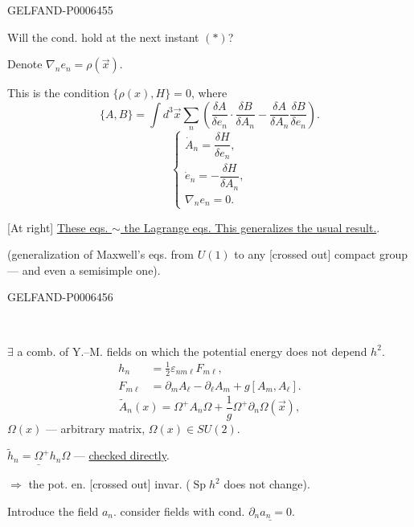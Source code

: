 \begin{GelfandAdjacentEvidence}{GELFAND-P000645}{5}


Will the cond. hold at the next instant \((*)\)?

Denote \(\nabla_n e_n=\rho(\vec x)\).

This is the condition \(\{\rho(x),H\}=0\), where
\[
\{A,B\}=\int d^3\vec x\sum_n
\left(\frac{\delta A}{\delta e_n}\cdot\frac{\delta B}{\delta A_n}
-\frac{\delta A}{\delta A_n}\frac{\delta B}{\delta e_n}\right).
\]
\[
\begin{cases}
\dot A_n=\dfrac{\delta H}{\delta e_n},\\
\dot e_n=-\dfrac{\delta H}{\delta A_n},\\
\nabla_n e_n=0.
\end{cases}
\]

[At right] \underline{These eqs. \(\sim\) the Lagrange eqs. This generalizes the usual result.}.

(generalization of Maxwell’s eqs. from \(U(1)\) to any [crossed out]
compact group --- and even a semisimple one).
\end{GelfandAdjacentEvidence}
\begin{GelfandAdjacentEvidence}{GELFAND-P000645}{6}


\begin{center}\textemdash\,\textperiodcentered\,\textemdash\end{center}

\(\exists\) a comb. of Y.–M. fields on which the potential energy does not depend \(h^2\).
\[
\begin{aligned}
h_n&=\frac12\varepsilon_{nm\ell}F_{m\ell},\\
F_{m\ell}&=\partial_m A_\ell-\partial_\ell A_m+g[A_m,A_\ell].
\end{aligned}
\]
\[
\widetilde A_n(x)=\Omega^+A_n\Omega+\frac1g\Omega^+\partial_n\Omega(\vec x),
\]
\(\Omega(x)\) --- arbitrary matrix, \(\Omega(x)\in SU(2)\).

\(\underline{\widetilde h_n=\Omega^+h_n\Omega}\) --- \underline{checked directly}.

\(\Rightarrow\) the pot. en. [crossed out] invar.
(\(\operatorname{Sp}h^2\) does not change).
\end{GelfandAdjacentEvidence}


Introduce the field \(a_n\). consider fields with cond. \(\underline{\partial_n a_n=0}\).


